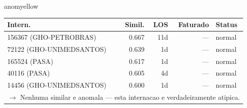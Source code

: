 \documentclass[a4paper,10pt]{article}
\begin{document}
\begin{anomalycard}[Internacao 150213 | GHO-PETROBRAS | MODERADO (z=2.34)]{anomyellow}
\begin{tabular}{l r r r l}\toprule\textbf{Intern.} & \textbf{Simil.} & \textbf{LOS} & \textbf{Faturado} & \textbf{Status} \\\midrule
156367 (GHO-PETROBRAS) & 0.667 & 11d & --- & \textcolor{jcubeblue}{normal} \\
72122 (GHO-UNIMEDSANTOS) & 0.639 & 1d & --- & \textcolor{jcubeblue}{normal} \\
165524 (PASA) & 0.617 & 1d & --- & \textcolor{jcubeblue}{normal} \\
40116 (PASA) & 0.605 & 4d & --- & \textcolor{jcubeblue}{normal} \\
14456 (GHO-UNIMEDSANTOS) & 0.600 & 1d & --- & \textcolor{jcubeblue}{normal} \\
\multicolumn{5}{l}{\textcolor{jcubeblue}{\small $\rightarrow$ Nenhuma similar e anomala --- esta internacao e verdadeiramente atipica.}} \\
\bottomrule\end{tabular}


\end{anomalycard}

\newpage
\end{document}
